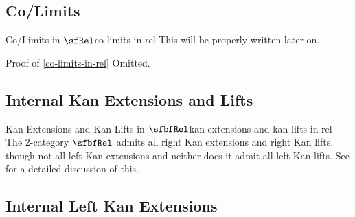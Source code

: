 \subsection{Co/Limits}\label{subsection-co-limits-in-rel}
\begin{proposition}{Co/Limits in $\sfRel$}{co-limits-in-rel}%
    This will be properly written later on.
\end{proposition}
\begin{Proof}{Proof of \cref{co-limits-in-rel}}%
    Omitted.
\end{Proof}
\subsection{Internal Kan Extensions and Lifts}\label{subsection-internal-kan-extensions-and-lifts-in-rel}
\begin{remark}{Kan Extensions and Kan Lifts in $\sfbfRel$}{kan-extensions-and-kan-lifts-in-rel}%
    The 2-category $\sfbfRel$ admits all right Kan extensions and right Kan lifts, though not all left Kan extensions and neither does it admit all left Kan lifts. See  for a detailed discussion of this.
\end{remark}
\subsection{Internal Left Kan Extensions}\label{subsection-internal-left-kan-extensions-in-rel}
